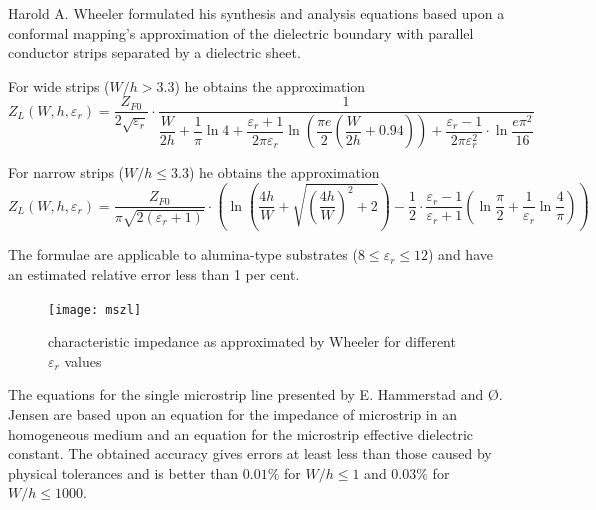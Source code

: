 \documentclass[10pt]{report}
\begin{document}
Harold A. Wheeler \cite{Wheeler2} formulated his synthesis and
analysis equations based upon a conformal mapping's approximation of
the dielectric boundary with parallel conductor strips separated by a
dielectric sheet.

\addvspace{12pt}

For wide strips ($W/h > 3.3$) he obtains the approximation
\begin{equation}
Z_{L}\left(W, h, \varepsilon_{r}\right) =
\frac{Z_{F0}}{2\sqrt{\varepsilon_{r}}}\cdot\frac{1}{\dfrac{W}{2h} + \dfrac{1}{\pi}\ln{4} + \dfrac{\varepsilon_{r} + 1}{2\pi \varepsilon_{r}} \ln{\left(\dfrac{\pi e}{2}\left(\dfrac{W}{2h} + 0.94\right)\right)} + \dfrac{\varepsilon_{r} - 1}{2\pi \varepsilon_{r}^{2}}\cdot \ln{\dfrac{e\pi^{2}}{16}}}
\end{equation}

For narrow strips ($W/h \le 3.3$) he obtains the approximation
\begin{equation}
Z_{L}\left(W, h, \varepsilon_{r}\right) =
\frac{Z_{F0}}{\pi \sqrt{2 \left(\varepsilon_{r} + 1\right)}} \cdot \left(\ln{\left(\frac{4h}{W} + \sqrt{\left(\frac{4h}{W}\right)^{2} + 2}\right)} - \frac{1}{2}\cdot \frac{\varepsilon_{r} - 1}{\varepsilon_{r} + 1}\left(\ln{\frac{\pi}{2}} + \frac{1}{\varepsilon_{r}} \ln{\frac{4}{\pi}}\right)\right)
\end{equation}

The formulae are applicable to alumina-type substrates ($8 \le
\varepsilon_r \le 12$) and have an estimated relative error less than
1 per cent.

\begin{figure}[ht]
\begin{center}
\texttt{[image: mszl]}
\end{center}
\caption{characteristic impedance as approximated by Wheeler for different $\varepsilon_{r}$ values}
\label{fig:mszl}
\end{figure}
\FloatBarrier

The equations for the single microstrip line presented by
E. Hammerstad and {\O}. Jensen \cite{Hammerstad} are based upon an
equation for the impedance of microstrip in an homogeneous medium and
an equation for the microstrip effective dielectric constant.  The
obtained accuracy gives errors at least less than those caused by
physical tolerances and is better than $0.01\%$ for $W/h \le 1$ and
$0.03\%$ for $W/h \le 1000$.
\end{document}

